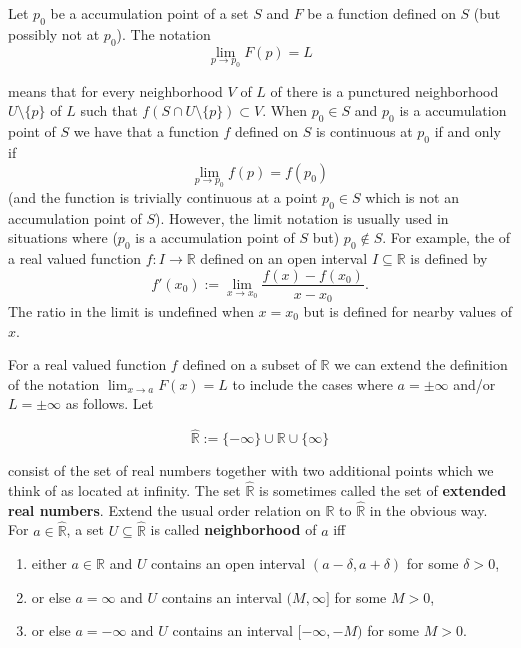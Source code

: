 \documentclass[10pt,a4paper,UTF8]{article}
\begin{document}
Let \(p_0\) be a accumulation point of a set \(S\) and \(F\) be a function defined on
\(S\) (but possibly not at \(p_0\)). The notation
\begin{equation*}
\label{eq:1}
   \lim_{p\to p_0}F(p) = L
\end{equation*}


means that
for every  neighborhood \(V\) of \(L\) of there is a punctured neighborhood \(U\setminus\{p\}\) of \(L\)
such that \(f(S\cap U\setminus\{p\})\subset V\).
When \(p_0\in S\) and \(p_0\) is a accumulation point of \(S\) we have that
a function \(f\) defined on \(S\) is continuous at \(p_0\)
if and only if
$$
\lim_{p\to p_0}f(p) =f(p_0)
$$
(and the function is  trivially continuous at a point \(p_0\in S\) which
is not an accumulation point of \(S\)).
However, the limit notation is usually used in situations where
(\(p_0\) is a accumulation point of \(S\) but) \(p_0\notin S\).
For example,
the  of a real valued function \(f:I\to\mathbb{R}\)
defined on an open interval \(I\subseteq\mathbb{R}\) is defined by
$$
f'(x_0):=\lim_{x\to x_0}\frac{f(x)-f(x_0)}{x-x_0}.
$$
The ratio in the limit is undefined when \(x=x_0\)
but is defined  for nearby values of \(x\).


For a real valued function \(f\) defined on a subset of \(\mathbb{R}\)
we can extend the definition of the notation
\(\lim_{x\to a}F(x)=L\) to include the cases where \(a=\pm\infty\)
and/or \(L=\pm\infty\) as follows.  Let

\[\hat{\mathbb{R}}:=\{-\infty\}\cup{\mathbb{R}}\cup\{\infty\}\]

consist of the set of real numbers together with two additional
points which we think of as located at infinity. The set \(\hat{\mathbb{R}}\)
is sometimes called the set of \textbf{extended real numbers}.
Extend the usual order relation on \(\mathbb{R}\) to \(\hat{\mathbb{R}}\) in the obvious way.
For \(a\in\hat{\mathbb{R}}\), a set \(U\subseteq\hat{\mathbb{R}}\) is called
\textbf{neighborhood} of  \(a\) iff

\begin{enumerate}
\item either \(a\in\mathbb{R}\) and \(U\) contains an open interval \((a-\delta,a+\delta)\) for some \(\delta  >  0\),
\item or else \(a=\infty\) and \(U\) contains an interval \((M,\infty]\) for some \(M > 0\),
\item or else \(a=-\infty\) and \(U\) contains an interval \([-\infty,-M)\) for some \(M > 0\).
\end{enumerate}
\end{document}
